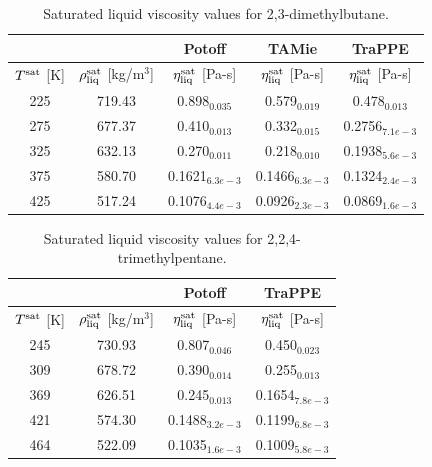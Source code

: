\documentclass[preprint,review,12pt]{elsarticle}
\begin{document}
	\begin{table}[h!]
		\caption{Saturated liquid viscosity values for 2,3-dimethylbutane.}
		\begin{center}
			\begin{tabular}{|c|c|c|c|c|}
				\hline
				&                                       & Potoff            & TAMie             & TraPPE            \\ \hline
				$T^{\rm sat}$ {[}K{]} & $\rho^{\rm sat}_{\rm liq}$ [kg/m$^3$] & $\eta_{\rm liq}^{\rm sat}$ {[}Pa-s{]} & $\eta_{\rm liq}^{\rm sat}$ {[}Pa-s{]} & $\eta_{\rm liq}^{\rm sat}$ {[}Pa-s{]} \\ \hline
				225 & 719.43 & 0.898$_{0.035}$   & 0.579$_{0.019}$   & 0.478$_{0.013}$   \\ \hline
				275 & 677.37 & 0.410$_{0.013}$   & 0.332$_{0.015}$   & 0.2756$_{7.1e-3}$ \\ \hline
				325 & 632.13 & 0.270$_{0.011}$   & 0.218$_{0.010}$   & 0.1938$_{5.6e-3}$ \\ \hline
				375 & 580.70 & 0.1621$_{6.3e-3}$ & 0.1466$_{6.3e-3}$ & 0.1324$_{2.4e-3}$ \\ \hline
				425 & 517.24 & 0.1076$_{4.4e-3}$ & 0.0926$_{2.3e-3}$ & 0.0869$_{1.6e-3}$ \\ \hline
			\end{tabular}
		\end{center}
	\end{table}
	
	\begin{table}[h!]
		\caption{Saturated liquid viscosity values for 2,2,4-trimethylpentane.}
		\begin{center}
			\begin{tabular}{|c|c|c|c|}
				\hline
				&                                       & Potoff            & TraPPE            \\ \hline
				$T^{\rm sat}$ {[}K{]} & $\rho^{\rm sat}_{\rm liq}$ [kg/m$^3$] & $\eta_{\rm liq}^{\rm sat}$ {[}Pa-s{]} & $\eta_{\rm liq}^{\rm sat}$ {[}Pa-s{]} \\ \hline
				245 & 730.93 & 0.807$_{0.046}$   & 0.450$_{0.023}$   \\ \hline
				309 & 678.72 & 0.390$_{0.014}$   & 0.255$_{0.013}$   \\ \hline
				369 & 626.51 & 0.245$_{0.013}$   & 0.1654$_{7.8e-3}$ \\ \hline
				421 & 574.30 & 0.1488$_{3.2e-3}$ & 0.1199$_{6.8e-3}$ \\ \hline
				464 & 522.09 & 0.1035$_{1.6e-3}$ & 0.1009$_{5.8e-3}$ \\ \hline
			\end{tabular}
		\end{center}
	\end{table}
\end{document}
